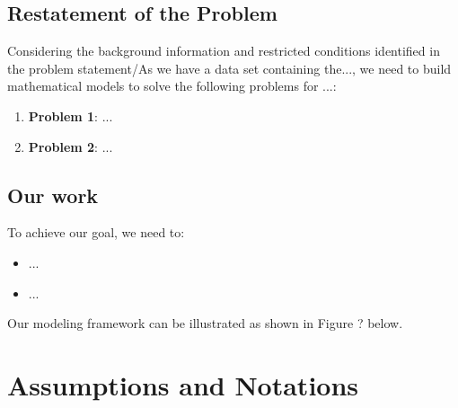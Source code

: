 \documentclass[12pt]{article}  %
\begin{document}
\subsection{Restatement of the Problem}
Considering the background information and restricted conditions identified in the problem statement/As we have a data set containing the..., we need to build mathematical models to solve the following problems for ...:




\begin{enumerate}[\bfseries 1.]
	\setlength{\parsep}{0ex} %
	\setlength{\topsep}{2ex} %
	\setlength{\itemsep}{1ex} %
	\item \textbf{Problem 1}: ...
	\item \textbf{Problem 2}: ...
\end{enumerate}





\subsection{Our work}
To achieve our goal, we need to:

\begin{itemize}
	\setlength{\parsep}{0ex} %
	\setlength{\topsep}{2ex} %
	\setlength{\itemsep}{1ex} %
	\item ...
	\item ...
\end{itemize}

Our modeling framework can be illustrated as shown in Figure ? below.




















\section{Assumptions and Notations}
\end{document}
